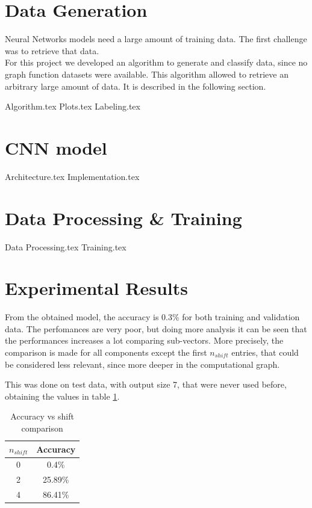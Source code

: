 \documentclass[11pt,a4paper]{scrartcl}
\begin{document}
	\section{Data Generation}
	Neural Networks models need a large amount of training data. The first challenge was to retrieve that data.\\
	For this project we developed an algorithm to generate and classify data, since no graph function datasets were available. This algorithm allowed to retrieve an arbitrary large amount of data. It is described in the following section.
	
	{Algorithm.tex}
	{Plots.tex}
	{Labeling.tex}


	\section{CNN model}
	{Architecture.tex}
	{Implementation.tex}
	
	\section{Data Processing \& Training}
	{Data Processing.tex}
	{Training.tex}

	\section{Experimental Results}
	From the obtained model, the accuracy is 0.3\% for both training and validation data. The perfomances are very poor, but doing more analysis it can be seen that the performances increases a lot comparing sub-vectors. More precisely, the comparison is made for all components except the first $n_{shift}$ entries, that could be considered less relevant, since more deeper in the computational graph.
	
	This was done on test data, with output size 7, that were never used before, obtaining the values in table \ref{table:accshift}.
	
	\begin{table}[h!]
		\centering
		\begin{tabular}{c|c}
			\hline
			$n_{shift}$ & Accuracy\\
			\hline
			\hline
			0 & 0.4\%\\
			2 & 25.89\%\\
			4 & 86.41\%
		\end{tabular}
		\caption{Accuracy vs shift comparison}
		\label{table:accshift}
	\end{table}
	
\end{document}
